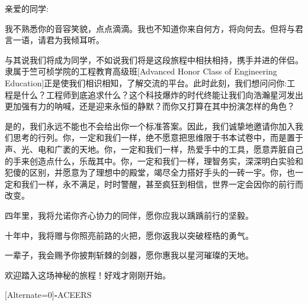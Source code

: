 \documentclass[12pt,a4paper]{article}
\begin{document}
\begin{titlepage}
\end{titlepage}
\begin{spacing}{2.2}
\tableofcontents
\end{spacing}
\newpage



\begin{spacing}{1.36}
{\kaishu \xiaosihao
\noindent 亲爱的同学:\par
我不熟悉你的音容笑貌，点点滴滴。我也不知道你来自何方，将向何去。但将与君言一语，请君为我倾耳听。\par
 与其说我们将成为同学，不如说我们将是这段旅程中相扶相持，携手并进的伴侣。隶属于竺可桢学院的工程教育高级班[Advanced Honor Class of Engineering Education]正是使我们相识相知，了解交流的平台。此时此刻，我们想问问你:工程是什么？工程师到底追求什么？这个科技爆炸的时代终能让我们向浩瀚星河发出更加强有力的呐喊，还是迎来永恒的静默？而你又打算在其中扮演怎样的角色？\par
是的，我们永远不能也不会给出你一个标准答案。因此，我们诚挚地邀请你加入我们思考的行列。你，一定和我们一样，绝不愿意把思维限于书本试卷中，而是置于声、光、电和广袤的天地。你，一定和我们一样，热爱手中的工具，愿意弄脏自己的手来创造点什么，乐哉其中。你，一定和我们一样，理智务实，深深明白实验和犯傻的区别，并愿意为了理想中的殿堂，竭尽全力搭好手头的一砖一宇。你，也一定和我们一样，永不满足，时时警醒，甚至疯狂到相信，世界一定会因你的前行而改变。\par
四年里，我将允诺你齐心协力的同伴，愿你应我以踽踽前行的坚毅。\par
十年中，我将赠与你照亮前路的火把，愿你返我以突破桎梏的勇气。\par
一辈子，我会赐予你披荆斩棘的剑器，愿你惠我以星河璀璨的天地。\par
欢迎踏入这场神秘的旅程！好戏才刚刚开始。\par
{\hspace*{0.7\textwidth}}{[Alternate=0]{\textbf{-}ACEERS}}}
\end{spacing}
\newpage
{}
{}
\vspace*{5pt}
\end{document}
